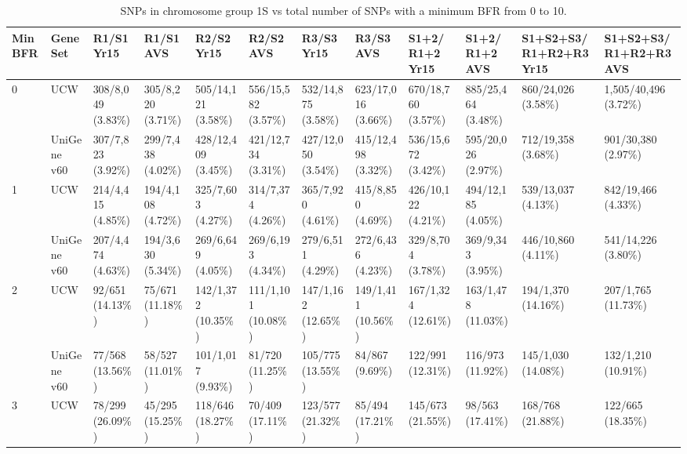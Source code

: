 \begin{sidewaystable}
\caption{ SNPs in chromosome group 1S vs total number of SNPs with a minimum BFR from 0 to 10. }
\centering
\label{app:yr15:bfrThresholds}
\begin{localsize}{6}{7}

\begin{tabular}{llp{1cm}p{1cm}p{1cm}p{1cm}p{1cm}p{1cm}p{1cm}p{1cm}p{1cm}p{1cm}}
\toprule
 Min  BFR   & Gene Set    & R1/S1 Yr15        & R1/S1 AVS         & R2/S2 Yr15         & R2/S2 AVS          & R3/S3 Yr15         & R3/S3 AVS          & S1+2/ R1+2 Yr15    & S1+2/ R1+2 AVS     & S1+S2+S3/ R1+R2+R3 Yr15   & S1+S2+S3/ R1+R2+R3 AVS   \\
\midrule
 0          & UCW         & 308/8,049 (3.83\%) & 305/8,220 (3.71\%) & 505/14,121 (3.58\%) & 556/15,582 (3.57\%) & 532/14,875 (3.58\%) & 623/17,016 (3.66\%) & 670/18,760 (3.57\%) & 885/25,464 (3.48\%) & 860/24,026 (3.58\%)        & 1,505/40,496 (3.72\%)     \\
            & UniGene v60 & 307/7,823 (3.92\%) & 299/7,438 (4.02\%) & 428/12,409 (3.45\%) & 421/12,734 (3.31\%) & 427/12,050 (3.54\%) & 415/12,498 (3.32\%) & 536/15,672 (3.42\%) & 595/20,026 (2.97\%) & 712/19,358 (3.68\%)        & 901/30,380 (2.97\%)       \\
 \midrule
 1          & UCW         & 214/4,415 (4.85\%) & 194/4,108 (4.72\%) & 325/7,603 (4.27\%)  & 314/7,374 (4.26\%)  & 365/7,920 (4.61\%)  & 415/8,850 (4.69\%)  & 426/10,122 (4.21\%) & 494/12,185 (4.05\%) & 539/13,037 (4.13\%)        & 842/19,466 (4.33\%)       \\
            & UniGene v60 & 207/4,474 (4.63\%) & 194/3,630 (5.34\%) & 269/6,649 (4.05\%)  & 269/6,193 (4.34\%)  & 279/6,511 (4.29\%)  & 272/6,436 (4.23\%)  & 329/8,704 (3.78\%)  & 369/9,343 (3.95\%)  & 446/10,860 (4.11\%)        & 541/14,226 (3.80\%)       \\
 \midrule
 2          & UCW         & 92/651 (14.13\%)   & 75/671 (11.18\%)   & 142/1,372 (10.35\%) & 111/1,101 (10.08\%) & 147/1,162 (12.65\%) & 149/1,411 (10.56\%) & 167/1,324 (12.61\%) & 163/1,478 (11.03\%) & 194/1,370 (14.16\%)        & 207/1,765 (11.73\%)       \\
            & UniGene v60 & 77/568 (13.56\%)   & 58/527 (11.01\%)   & 101/1,017 (9.93\%)  & 81/720 (11.25\%)    & 105/775 (13.55\%)   & 84/867 (9.69\%)     & 122/991 (12.31\%)   & 116/973 (11.92\%)   & 145/1,030 (14.08\%)        & 132/1,210 (10.91\%)       \\
 \midrule
 3          & UCW         & 78/299 (26.09\%)   & 45/295 (15.25\%)   & 118/646 (18.27\%)   & 70/409 (17.11\%)    & 123/577 (21.32\%)   & 85/494 (17.21\%)    & 145/673 (21.55\%)   & 98/563 (17.41\%)    & 168/768 (21.88\%)          & 122/665 (18.35\%)         \\

\end{tabular}
\end{localsize}
\end{sidewaystable}
